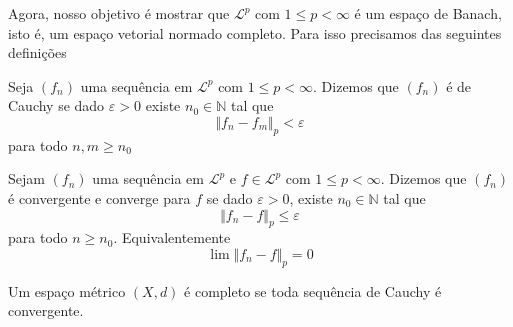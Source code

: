 \documentclass[a4paper, 11pt]{book}
\theoremstyle{definition}
\newcommand{\bN}{\mathbb{N}}
\newcommand{\cL}{\mathcal{L}}
\begin{document}
Agora, nosso objetivo é mostrar que $\cL^p$ com $1 \leqslant p < \infty$ é um espaço de Banach, isto é, um espaço vetorial normado completo.
Para isso precisamos das seguintes definições

\begin{dbox}
    Seja $(f_n)$ uma sequência em $\cL^p$ com $1 \leqslant p < \infty$. Dizemos que $(f_n)$ é de Cauchy se dado $\varepsilon > 0$ existe $n_0 \in \bN$ tal que
    \[
        \Vert f_n - f_m \Vert_p < \varepsilon
    \]
    para todo $n,m \geqslant n_0$
\end{dbox}

\begin{dbox}
    Sejam $(f_n)$ uma sequência em $\cL^p$ e $f \in \cL^p$ com $1 \leqslant p < \infty$. Dizemos que $(f_n)$ é convergente e converge para $f$ se dado $\varepsilon > 0$, existe $n_0 \in \bN$ tal que
    \[
        \Vert f_n - f \Vert_p \leqslant \varepsilon
    \]
    para todo $n \geqslant n_0$. Equivalentemente
    \[
        \lim \Vert f_n - f \Vert_p = 0
    \]
\end{dbox}

\begin{dbox}
    Um espaço métrico $(X,d)$ é completo se toda sequência de Cauchy é convergente.
\end{dbox}
\end{document}
